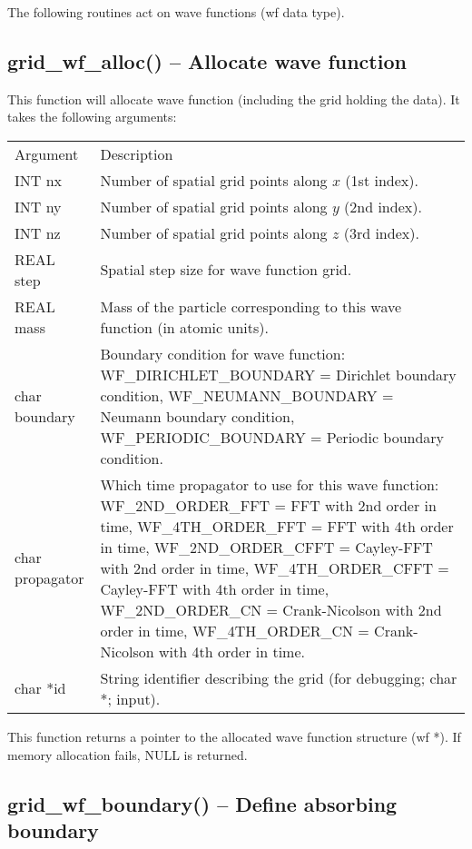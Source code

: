 \documentclass[12pt,letterpaper]{report}
\begin{document}
The following routines act on wave functions (wf data type).

\subsection{grid\_wf\_alloc() -- Allocate wave function}

This function will allocate wave function (including the grid holding the data). It takes the following arguments:
\begin{longtable}{p{} p{}}
Argument & Description\\
\cline{1-2}
INT nx & Number of spatial grid points along $x$ (1st index).\\
INT ny & Number of spatial grid points along $y$ (2nd index).\\
INT nz & Number of spatial grid points along $z$ (3rd index).\\
REAL step & Spatial step size for wave function grid.\\
REAL mass & Mass of the particle corresponding to this wave function (in atomic units).\\
char boundary & Boundary condition for wave function: WF\_DIRICHLET\_BOUNDARY = Dirichlet boundary condition, WF\_NEUMANN\_BOUNDARY = Neumann boundary condition, WF\_PERIODIC\_BOUNDARY = Periodic boundary condition.\\
char propagator & Which time propagator to use for this wave function: WF\_2ND\_ORDER\_FFT = FFT with 2nd order in time, WF\_4TH\_ORDER\_FFT = FFT with 4th order in time, WF\_2ND\_ORDER\_CFFT = Cayley-FFT with 2nd order in time, WF\_4TH\_ORDER\_CFFT = Cayley-FFT with 4th order in time, WF\_2ND\_ORDER\_CN = Crank-Nicolson with 2nd order in time, WF\_4TH\_ORDER\_CN = Crank-Nicolson with 4th order in time.\\
char *id & String identifier describing the grid (for debugging; char *; input).
\end{longtable}
\noindent
This function returns a pointer to the allocated wave function structure (wf *). If memory allocation fails, NULL is returned.

\subsection{grid\_wf\_boundary() -- Define absorbing boundary}
\end{document}
